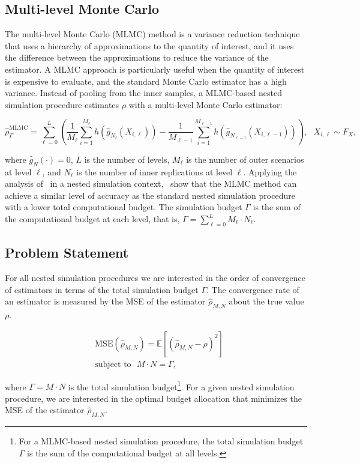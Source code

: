\subsection{Multi-level Monte Carlo}

The multi-level Monte Carlo (MLMC) method is a variance reduction technique that uses a hierarchy of approximations to the quantity of interest, and it uses the difference between the approximations to reduce the variance of the estimator.
A MLMC approach is particularly useful when the quantity of interest is expensive to evaluate, and the standard Monte Carlo estimator has a high variance.
Instead of pooling from the inner samples, a MLMC-based nested simulation procedure estimates $\rho$ with a multi-level Monte Carlo estimator:

\begin{equation*}
    \hat{\rho}^{\text{MLMC}}_\Gamma = \sum_{\ell=0}^{L} \left( \frac{1}{M_{\ell}} \sum_{i=1}^{M_{\ell}} h(\hat{g}_{N_{\ell}}(X_{i, \ell})) - \frac{1}{M_{\ell-1}} \sum_{i=1}^{M_{\ell-1}} h(\hat{g}_{N_{\ell-1}}(X_{i, \ell-1})) \right), ~~~ X_{i, \ell} \sim F_X,
\end{equation*}

where $\hat{g}_N(\cdot) = 0$, $L$ is the number of levels, $M_{\ell}$ is the number of outer scenarios at level $\ell$, and $N_{\ell}$ is the number of inner replications at level $\ell$.
Applying the analysis of~\cite{giles2015multilevel} in a nested simulation context,~\cite{giles2019multilevel} show that the MLMC method can achieve a similar level of accuracy as the standard nested simulation procedure with a lower total computational budget.
The simulation budget $\Gamma$ is the sum of the computational budget at each level, that is, $\Gamma = \sum_{\ell=0}^{L} M_{\ell} \cdot N_{\ell}$.

\subsection{Problem Statement}

For all nested simulation procedures we are interested in the order of convergence of estimators in terms of the total simulation budget $\Gamma$.
The convergence rate of an estimator is measured by the MSE of the estimator $\hat{\rho}_{M, N}$ about the true value $\rho$.

\begin{align}
    & \text{MSE}(\hat{\rho}_{M, N}) = \mathbb{E} \left[ \left( \hat{\rho}_{M, N} - \rho \right)^2 \right] \nonumber \\
    & \text{subject to} ~~~ M \cdot N = \Gamma, 
\end{align}

where $\Gamma = M \cdot N$ is the total simulation budget\footnote{For a MLMC-based nested simulation procedure, the total simulation budget $\Gamma$ is the sum of the computational budget at all levels.}. 
For a given nested simulation procedure, we are interested in the optimal budget allocation that minimizes the MSE of the estimator $\hat{\rho}_{M, N}$.